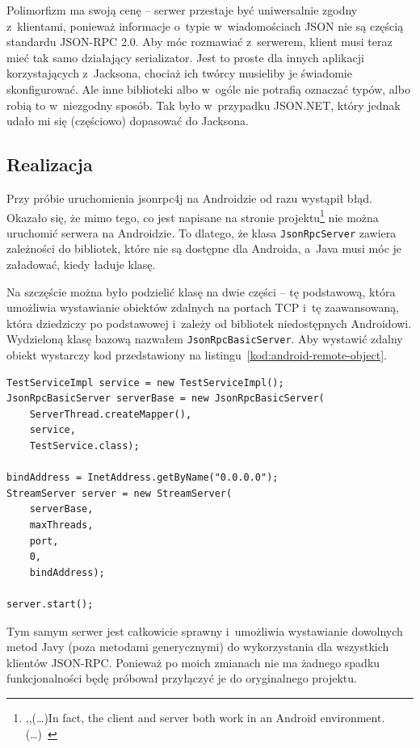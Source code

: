 Polimorfizm ma swoją cenę -- serwer przestaje być uniwersalnie zgodny z~klientami, ponieważ informacje o~typie w~wiadomościach JSON nie są częścią standardu JSON-RPC 2.0.
Aby móc rozmawiać z~serwerem, klient musi teraz mieć tak samo działający serializator.
Jest to proste dla innych aplikacji korzystających z~Jacksona, chociaż ich twórcy musieliby je świadomie skonfigurować. Ale inne biblioteki albo w~ogóle nie potrafią oznaczać typów, albo robią to w~niezgodny sposób.
Tak było w~przypadku JSON.NET, który jednak udało mi się (częściowo) dopasować do Jacksona. 


\subsection{Realizacja}
Przy próbie uruchomienia jsonrpc4j na Androidzie od razu wystąpił błąd. Okazało się, że mimo tego, co jest napisane na stronie projektu\footnote{,,(\ldots)In fact, the client and server both work in an Android environment.(\ldots)~\cite{jsonrpc4j}} nie można uruchomić serwera na Androidzie.
To dlatego, że klasa \texttt{JsonRpcServer} zawiera zależności do bibliotek, które nie są dostępne dla Androida, a~Java musi móc je załadować, kiedy ładuje klasę.

Na szczęście można było podzielić klasę na dwie części -- tę podstawową, która umożliwia wystawianie obiektów zdalnych na portach TCP i~tę zaawansowaną, która dziedziczy po podstawowej i~zależy od bibliotek niedostępnych Androidowi.
Wydzieloną klasę bazową nazwałem \texttt{JsonRpcBasicServer}. Aby wystawić zdalny obiekt wystarczy kod przedstawiony na listingu~\ref{kod:android-remote-object}.

\begin{lstlisting}[float, frame=single, caption={Tworzenie obiektu zdalnego za pomocą jsonrpc4j dostosowanego do Androida.}, label=kod:android-remote-object]
TestServiceImpl service = new TestServiceImpl();
JsonRpcBasicServer serverBase = new JsonRpcBasicServer(
    ServerThread.createMapper(),
    service,
    TestService.class);
		
bindAddress = InetAddress.getByName("0.0.0.0");
StreamServer server = new StreamServer(
    serverBase,
    maxThreads,
    port,
    0,
    bindAddress);

server.start();
\end{lstlisting}

Tym samym serwer jest całkowicie sprawny i~umożliwia wystawianie dowolnych metod Javy (poza metodami generycznymi) do wykorzystania dla wszystkich klientów JSON-RPC.
Ponieważ po moich zmianach nie ma żadnego spadku funkcjonalności będę próbował przyłączyć je do oryginalnego projektu.



